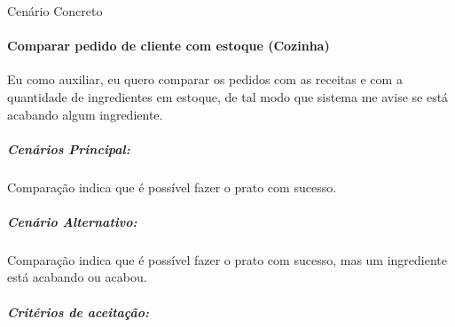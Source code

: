 \begin{itemize}
\begin{description}
  \item [Cenário Concreto]

\end{description}
\end{itemize}

\paragraph{Comparar pedido de cliente com estoque (Cozinha)}

Eu como auxiliar, eu quero comparar os pedidos com as receitas e com a quantidade de ingredientes em estoque, de tal modo que sistema me avise se está acabando algum ingrediente.

\subparagraph{Cenários Principal:}

Comparação indica que é possível fazer o prato com sucesso.

\subparagraph{Cenário Alternativo:}

Comparação indica que é possível fazer o prato com sucesso, mas um ingrediente está acabando ou acabou.

\subparagraph{Critérios de aceitação:}

